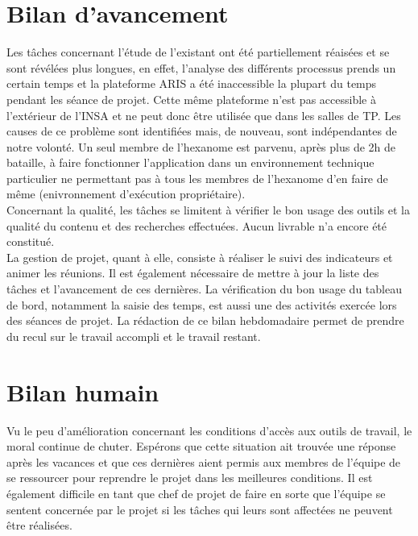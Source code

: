 
\section{Bilan d'avancement}

Les tâches concernant l'étude de l'existant ont été partiellement réaisées et se sont révélées plus longues, en effet, l'analyse des différents processus prends un certain temps et la plateforme ARIS a été inaccessible la plupart du temps pendant les séance de projet. Cette même plateforme n'est pas accessible à l'extérieur de l'INSA et ne peut donc être utilisée que dans les salles de TP. Les causes de ce problème sont identifiées mais, de nouveau, sont indépendantes de notre volonté. Un seul membre de l'hexanome est parvenu, après plus de 2h de bataille, à faire fonctionner l'application dans un environnement technique particulier ne permettant pas à tous les membres de l'hexanome d'en faire de même (enivronnement d'exécution propriétaire). \\

Concernant la qualité, les tâches se limitent à vérifier le bon usage des outils et la qualité du contenu et des recherches effectuées. Aucun livrable n'a encore été constitué. \\

La gestion de projet, quant à elle, consiste à réaliser le suivi des indicateurs et animer les réunions. Il est également nécessaire de mettre à jour la liste des tâches et l'avancement de ces dernières. La vérification du bon usage du tableau de bord, notamment la saisie des temps, est aussi une des activités exercée lors des séances de projet. La rédaction de ce bilan hebdomadaire permet de prendre du recul sur le travail accompli et le travail restant. \\

\section{Bilan humain}

Vu le peu d'amélioration concernant les conditions d'accès aux outils de travail, le moral continue de chuter. Espérons que cette situation ait trouvée une réponse après les vacances et que ces dernières aient permis aux membres de l'équipe de se ressourcer pour reprendre le projet dans les meilleures conditions. Il est également difficile en tant que chef de projet de faire en sorte que l'équipe se sentent concernée par le projet si les tâches qui leurs sont affectées ne peuvent être réalisées.
